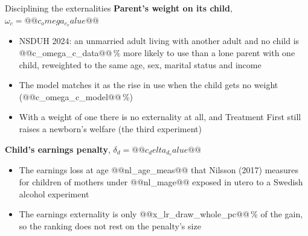\documentclass[aspectratio=169,11pt]{beamer}
\newcommand{\TF}{Treatment First}
\newcommand{\pc}{\,\%}
\begin{document}
\begin{frame}{Disciplining the externalities}
\textbf{Parent's weight on its child}, $\omega_c=@@c_omega_c_value@@$
\begin{itemize}
\item NSDUH 2024: an unmarried adult living with another adult and no child is @@c_omega_c_data@@\pc{} more likely to use than a lone parent with one child, reweighted to the same age, sex, marital status and income
\item The model matches it as the rise in use when the child gets no weight (@@c_omega_c_model@@\pc)
\item With a weight of one there is no externality at all, and \TF{} still raises a newborn's welfare (the third experiment)
\end{itemize}
\vspace{0.2cm}
\textbf{Child's earnings penalty}, $\delta_d=@@c_delta_d_value@@$
\begin{itemize}
\item The earnings loss at age @@nl_age_meas@@ that Nilsson (2017) measures for children of mothers under @@nl_mage@@ exposed in utero to a Swedish alcohol experiment
\item The earnings externality is only @@x_lr_draw_whole_pc@@\pc{} of the gain, so the ranking does not rest on the penalty's size
\end{itemize}
\end{frame}
\end{document}
